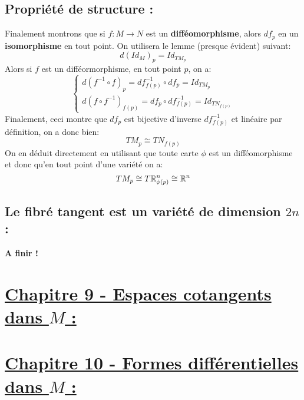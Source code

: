       \subsection*{Propriété de structure {:}}
      Finalement montrons que si \( f : M \longrightarrow N \) est un \textbf{difféomorphisme}, alors \( df_p \) en un \textbf{isomorphisme} en tout point. On utilisera le lemme (presque évident) suivant:
      \[ 
         d(Id_M)_p = Id_{TM_p} 
      \]
      Alors si \( f \) est un difféormorphisme, en tout point \( p \), on a:
      \[ 
         \begin{cases}
            d(f^{-1} \circ f)_p = df^{-1}_{f(p)} \circ df_p = Id_{TM_p}\\
            d(f \circ f^{-1})_{f(p)} = df_{p} \circ df^{-1}_{f(p)} = Id_{TN_{f(p)}}
         \end{cases}
      \]
      Finalement, ceci montre que \( df_p \) est bijective d'inverse \( df^{-1}_{f(p)} \) et linéaire par définition, on a donc bien:
      \[ 
         TM_p \cong TN_{f(p)} 
      \]
      On en déduit directement en utilisant que toute carte \( \phi \) est un difféomorphisme et donc qu'en tout point d'une variété on a:
      \[ 
         TM_p \cong T\mathbb{R}^n_{\phi(p)} \cong \mathbb{R}^n 
      \]

   \subsection*{Le fibré tangent est un variété de dimension \( 2n \) {:}}
      {\textbf{\color{red} A finir !}}

\section*{\uline{Chapitre 9 - Espaces cotangents dans \( M \) {:}}}
\section*{\uline{Chapitre 10 - Formes différentielles dans \( M \) {:}}}
